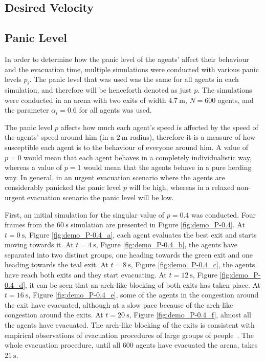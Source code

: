 \subsection{Desired Velocity}


\subsection{Panic Level}
In order to determine how the panic level of the agents' affect their behaviour and the evacuation time, multiple simulations were conducted with various panic levels $p_i$. The panic level that was used was the same for all agents in each simulation, and therefore will be henceforth denoted as just $p$. The simulations were conducted in an arena with two exits of width $\SI{4.7}{\meter}$, $N=600$ agents, and the parameter $\alpha_i=0.6$ for all agents was used.

The panic level $p$ affects how much each agent's speed is affected by the speed of the agents' speed around him (in a $\SI{2}{\meter}$ radius), therefore it is a measure of how susceptible each agent is to the behaviour of everyone around him. A value of $p=0$ would mean that each agent behaves in a completely individualistic way, whereas a value of $p=1$ would mean that the agents behave in a pure herding way. In general, in an urgent evacuation scenario where the agents are considerably panicked the panic level $p$ will be high, whereas in a relaxed non-urgent evacuation scenario the panic level will be low.

First, an initial simulation for the singular value of $p = 0.4$ was conducted. Four frames from the $\SI{60}{\second}$ simulation are presented in Figure \ref{fig:demo_P-0.4}. At $t=\SI{0}{\second}$, Figure \ref{fig:demo_P-0.4_a}, each agent evaluates the best exit and starts moving towards it. At $t=\SI{4}{\second}$, Figure \ref{fig:demo_P-0.4_b}, the agents have separated into two distinct groups, one heading towards the green exit and one heading towards the teal exit. At $t=\SI{8}{\second}$, Figure \ref{fig:demo_P-0.4_c}, the agents have reach both exits and they start evacuating. At $t=\SI{12}{\second}$, Figure \ref{fig:demo_P-0.4_d}, it can be seen that an arch-like blocking of both exits has taken place. At $t=\SI{16}{\second}$, Figure \ref{fig:demo_P-0.4_e}, some of the agents in the congestion around the exit have evacuated, although at a slow pace because of the arch-like congestion around the exits. At $t=\SI{20}{\second}$, Figure \ref{fig:demo_P-0.4_f}, almost all the agents have evacuated. The arch-like blocking of the exits is consistent with empirical observations of evacuation procedures of large groups of people~\cite{Helbing2000}. The whole evacuation procedure, until all $600$ agents have evacuated the arena, takes $\SI{21}{\second}$.

